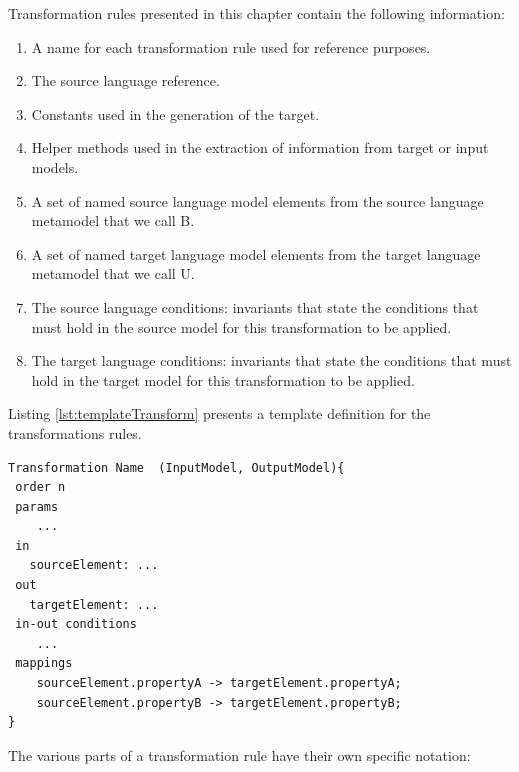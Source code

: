 Transformation rules presented in this chapter contain the following information:

\begin{enumerate}

\item A name for each transformation rule used for reference purposes.

\item The source language reference.

\item Constants used in the generation of the target.

\item Helper methods used in the extraction of information from target or input models.

\item A set of named source language model elements from the source language metamodel that we call B.

\item A set of named target language model elements from the target language metamodel that we call U.

\item The source language conditions: invariants that state the conditions that must hold in the source model for this transformation to be applied.

\item The target language conditions: invariants that state the conditions that must hold in the target model for this transformation to be applied.

\end{enumerate}


Listing \ref{lst:templateTransform} presents a template definition for the transformations rules.

\begin{lstlisting}[style=mine,caption=Template definition for transformation rules,label=lst:templateTransform]
Transformation Name  (InputModel, OutputModel){
 order n
 params
 	...
 in
   sourceElement: ...
 out
   targetElement: ...
 in-out conditions
 	...
 mappings
    sourceElement.propertyA -> targetElement.propertyA;
    sourceElement.propertyB -> targetElement.propertyB;
}
\end{lstlisting}

The various parts of a transformation rule have their own  specific notation:

